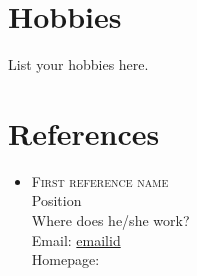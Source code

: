 \documentclass[a4paper,10pt]{article}
\begin{document}
\section{Hobbies}

List your hobbies here.


\newpage
\section{References}

\begin{itemize}

\item \textsc{First reference name} \\
Position \\
Where does he/she work?\\
Email: \href{mailto:emailid}{emailid}\\
Homepage: \href{weblink}{}


\end{itemize}
\end{document}
